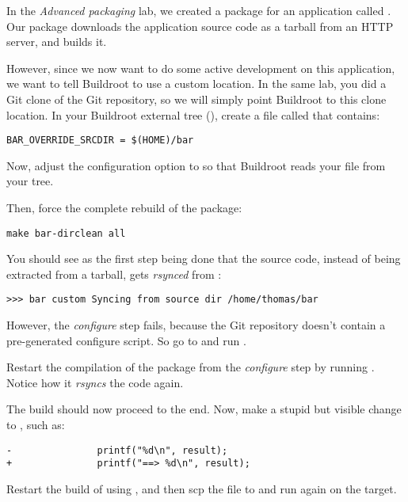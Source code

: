 In the {\em Advanced packaging} lab, we created a package for an
application called . Our  package downloads the
application source code as a tarball from an HTTP server, and builds
it.

However, since we now want to do some active development on this
application, we want to tell Buildroot to use a custom location. In
the same lab, you did a Git clone of the  Git repository, so
we will simply point Buildroot to this clone location. In your
Buildroot external tree (), create a file called
 that contains:

\begin{verbatim}
BAR_OVERRIDE_SRCDIR = $(HOME)/bar
\end{verbatim}

Now, adjust the  configuration option
to  so that Buildroot reads your
 file from your  tree.

Then, force the complete rebuild of the  package:

\begin{verbatim}
make bar-dirclean all
\end{verbatim}

You should see as the first step being done that the  source
code, instead of being extracted from a tarball, gets {\em rsynced}
from :

\begin{verbatim}
>>> bar custom Syncing from source dir /home/thomas/bar
\end{verbatim}

However, the {\em configure} step fails, because the Git repository
doesn't contain a pre-generated configure script. So go to
 and run .

Restart the compilation of the  package from the {\em
  configure} step by running . Notice how
it {\em rsyncs} the code again.

The build should now proceed to the end. Now, make a stupid but
visible change to , such as:

\begin{verbatim}
-               printf("%d\n", result);
+               printf("==> %d\n", result);
\end{verbatim}

Restart the build of  using , and
then scp the file  to
 and run  again on the target.

